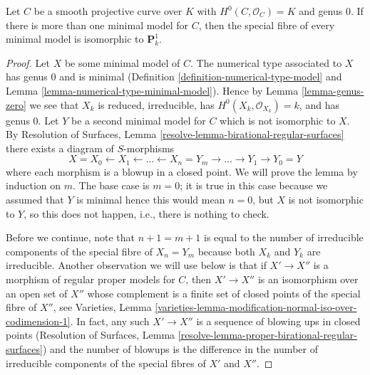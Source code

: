 %
\begin{lemma}
\label{lemma-nonuniqueness}
Let $C$ be a smooth projective curve over $K$ with $H^0(C, \mathcal{O}_C) = K$
and genus $0$. If there is more than one minimal model for $C$, then
the special fibre of every minimal model is isomorphic to $\mathbf{P}^1_k$.
\end{lemma}

\begin{proof}
Let $X$ be some minimal model of $C$. The numerical type associated to $X$
has genus $0$ and is minimal (Definition \ref{definition-numerical-type-model}
and Lemma \ref{lemma-numerical-type-minimal-model}).
Hence by Lemma \ref{lemma-genus-zero} we see that
$X_k$ is reduced, irreducible, has $H^0(X_k, \mathcal{O}_{X_k}) = k$,
and has genus $0$. Let $Y$ be a second minimal model for $C$
which is not isomorphic to $X$. By
Resolution of Surfaces, Lemma \ref{resolve-lemma-birational-regular-surfaces}
there exists a diagram of $S$-morphisms
$$
X = X_0 \leftarrow X_1 \leftarrow \ldots \leftarrow X_n = Y_m
\to \ldots \to Y_1 \to Y_0 = Y
$$
where each morphism is a blowup in a closed point. We will prove the
lemma by induction on $m$. The base case is $m = 0$; it is
true in this case because we assumed that $Y$ is minimal
hence this would mean $n = 0$, but $X$ is not isomorphic
to $Y$, so this does not happen, i.e., there is nothing to check.

\medskip\noindent
Before we continue, note that $n + 1 = m + 1$ is equal to the number of
irreducible components of the special fibre of $X_n = Y_m$ because
both $X_k$ and $Y_k$ are irreducible. Another observation we
will use below is that if $X' \to X''$ is a morphism
of regular proper models for $C$, then $X' \to X''$ is an isomorphism
over an open set of $X''$ whose complement is a finite set
of closed points of the special fibre of $X''$, see
Varieties, Lemma
\ref{varieties-lemma-modification-normal-iso-over-codimension-1}.
In fact, any such $X' \to X''$ is a sequence
of blowing ups in closed points (Resolution of Surfaces, Lemma
\ref{resolve-lemma-proper-birational-regular-surfaces}) and the
number of blowups is the difference in the number of irreducible
components of the special fibres of $X'$ and $X''$.


\end{proof}
